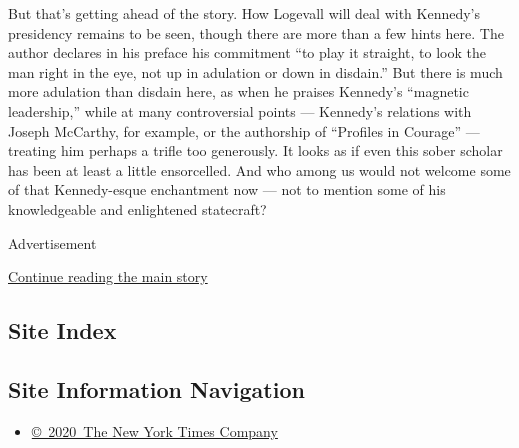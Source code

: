 But that's getting ahead of the story. How Logevall will deal with
Kennedy's presidency remains to be seen, though there are more than a
few hints here. The author declares in his preface his commitment ``to
play it straight, to look the man right in the eye, not up in adulation
or down in disdain.'' But there is much more adulation than disdain
here, as when he praises Kennedy's ``magnetic leadership,'' while at
many controversial points --- Kennedy's relations with Joseph McCarthy,
for example, or the authorship of ``Profiles in Courage'' --- treating
him perhaps a trifle too generously. It looks as if even this sober
scholar has been at least a little ensorcelled. And who among us would
not welcome some of that Kennedy-esque enchantment now --- not to
mention some of his knowledgeable and enlightened statecraft?

Advertisement

\protect\hyperlink{after-bottom}{Continue reading the main story}

\hypertarget{site-index}{%
\subsection{Site Index}\label{site-index}}

\hypertarget{site-information-navigation}{%
\subsection{Site Information
Navigation}\label{site-information-navigation}}

\begin{itemize}
\tightlist
\item
  \href{https://help.nytimes3xbfgragh.onion/hc/en-us/articles/115014792127-Copyright-notice}{©~2020~The
  New York Times Company}
\end{itemize}

